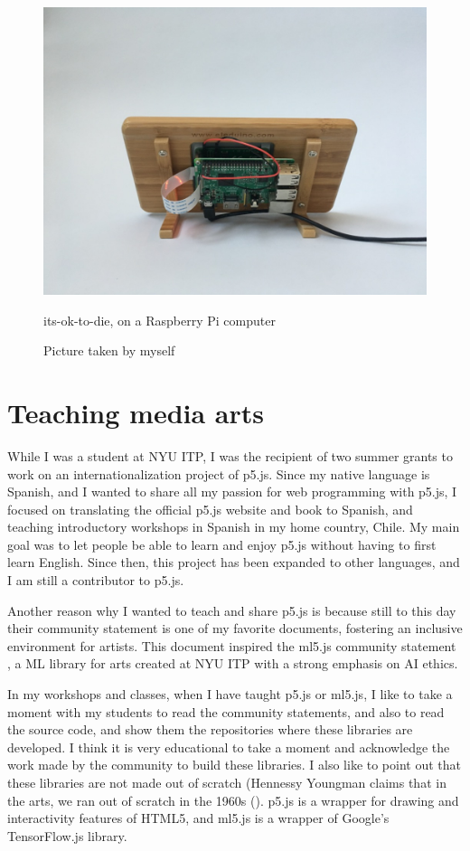 \begin{figure}[ht]
  \centering
  \includegraphics[width=0.75\linewidth,height=0.35\textheight,keepaspectratio]{images/its-ok-to-die-raspberry.jpg}
  \caption{its-ok-to-die, on a Raspberry Pi computer}
  \caption*{Picture taken by myself}
  \label{fig:its-ok-to-die-raspberry}
\end{figure}

\section{Teaching media arts}

While I was a student at \acrshort{NYU} \acrshort{ITP}, I was the recipient of two summer grants to work on an internationalization project of p5.js. Since my native language is Spanish, and I wanted to share all my passion for web programming with p5.js, I focused on translating the official p5.js website and book to Spanish, and teaching introductory workshops in Spanish in my home country, Chile. My main goal was to let people be able to learn and enjoy p5.js without having to first learn English. Since then, this project has been expanded to other languages, and I am still a contributor to p5.js.

Another reason why I wanted to teach and share p5.js is because still to this day their community statement \cite{website-p5js-community-statement} is one of my favorite documents, fostering an inclusive environment for artists. This document inspired the ml5.js community statement \cite{website-ml5js-community-statement}, a \acrshort{ML} library for arts created at \acrshort{NYU} \acrshort{ITP} with a strong emphasis on \acrshort{AI} ethics.

In my workshops and classes, when I have taught p5.js or ml5.js, I like to take a moment with my students to read the community statements, and also to read the source code, and show them the repositories where these libraries are developed. I think it is very educational to take a moment and acknowledge the work made by the community to build these libraries. I also like to point out that these libraries are not made out of scratch (Hennessy Youngman claims that in the arts, we ran out of scratch in the 1960s (\cite{hennessy-youngman-art-thoughtz-how-to-make-an-art}). p5.js is a wrapper for drawing and interactivity features of HTML5, and ml5.js is a wrapper of Google's TensorFlow.js library.

